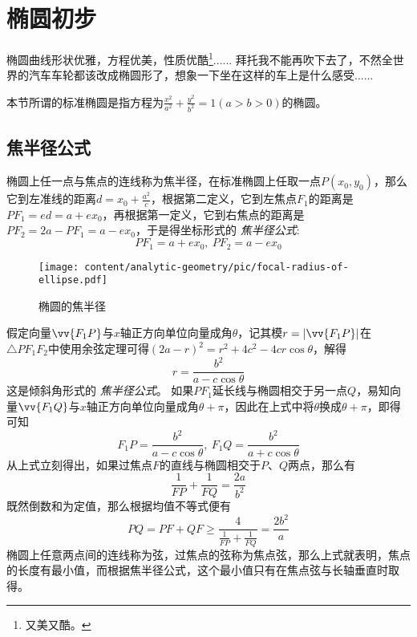 
\section{椭圆初步}
\label{sec:oval-preliminary-discussion}

椭圆曲线形状优雅，方程优美，性质优酷\footnote{又美又酷。}...... 拜托我不能再吹下去了，不然全世界的汽车车轮都该改成椭圆形了，想象一下坐在这样的车上是什么感受......

本节所谓的标准椭圆是指方程为$\frac{x^2}{a^2}+\frac{y^2}{b^2}=1(a>b>0)$的椭圆。

\subsection{焦半径公式}
\label{sec:oval-focal-radius}

椭圆上任一点与焦点的连线称为焦半径，在标准椭圆上任取一点$P(x_0,y_0)$，那么它到左准线的距离$d=x_0+\frac{a^2}{c}$，根据第二定义，它到左焦点$F_1$的距离是$PF_1=ed=a+ex_0$，再根据第一定义，它到右焦点的距离是$PF_2=2a-PF_1=a-ex_0$，于是得坐标形式的 \emph{焦半径公式}:
\begin{equation}
  \label{eq:oval-focal-radius-in-xy}
  PF_1=a+ex_0, \  PF_2=a-ex_0
\end{equation}

\begin{figure}[htbp]
  \centering
\texttt{[image: content/analytic-geometry/pic/focal-radius-of-ellipse.pdf]}
\caption{椭圆的焦半径}
\label{fig:focal-radius-of-ellipse}
\end{figure}

假定向量$\vv{F_1P}$与$x$轴正方向单位向量成角$\theta$，记其模$r=|\vv{F_1P}|$在$\triangle PF_1F_2$中使用余弦定理可得$(2a-r)^2=r^2+4c^2-4cr\cos{\theta}$，解得
\begin{equation}
  \label{eq:oval-focal-radius-theta}
  r=\frac{b^2}{a-c\cos{\theta}}
\end{equation}
这是倾斜角形式的 \emph{焦半径公式}。
如果$PF_1$延长线与椭圆相交于另一点$Q$，易知向量$\vv{F_1Q}$与$x$轴正方向单位向量成角$\theta+\pi$，因此在上式中将$\theta$换成$\theta+\pi$，即得可知
\begin{equation}
  \label{eq:oval-focal-radius-theta-2}
  F_1P=\frac{b^2}{a-c\cos{\theta}}, \  F_1Q=\frac{b^2}{a+c\cos{\theta}}
\end{equation}
从上式立刻得出，如果过焦点$F$的直线与椭圆相交于$P$、$Q$两点，那么有
\begin{equation}
  \label{eq:oval-focal-line-split}
  \frac{1}{FP}+\frac{1}{FQ}=\frac{2a}{b^2}
\end{equation}
既然倒数和为定值，那么根据均值不等式便有
\begin{equation*}
  PQ=PF+QF \geqslant \frac{4}{\frac{1}{FP}+\frac{1}{FQ}}=\frac{2b^2}{a}
\end{equation*}
椭圆上任意两点间的连线称为弦，过焦点的弦称为焦点弦，那么上式就表明，焦点的长度有最小值，而根据焦半径公式，这个最小值只有在焦点弦与长轴垂直时取得。

